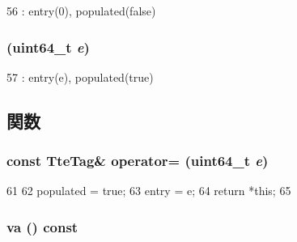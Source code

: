 \begin{DoxyCode}
56 : entry(0), populated(false) {}
\end{DoxyCode}
\hypertarget{classSparcISA_1_1TteTag_a8f7dc249a9d715effed53335e15101fd}{
\subsubsection[{TteTag}]{ (uint64\_\-t {\em e})}}
\label{classSparcISA_1_1TteTag_a8f7dc249a9d715effed53335e15101fd}



\begin{DoxyCode}
57 : entry(e), populated(true) {}
\end{DoxyCode}


\subsection{関数}
\hypertarget{classSparcISA_1_1TteTag_add1276ee8855aa13525810c155a56124}{
\subsubsection[{operator=}]{\setlength{\rightskip}{0pt plus 5cm}const {\bf TteTag}\& operator= (uint64\_\-t {\em e})}}
\label{classSparcISA_1_1TteTag_add1276ee8855aa13525810c155a56124}



\begin{DoxyCode}
61     {
62         populated = true;
63         entry = e;
64         return *this;
65     }
\end{DoxyCode}
\hypertarget{classSparcISA_1_1TteTag_aeb77f8a1316412aa7d84a8fc26cfc34f}{
\subsubsection[{va}]{ va () const}}
\label{classSparcISA_1_1TteTag_aeb77f8a1316412aa7d84a8fc26cfc34f}



